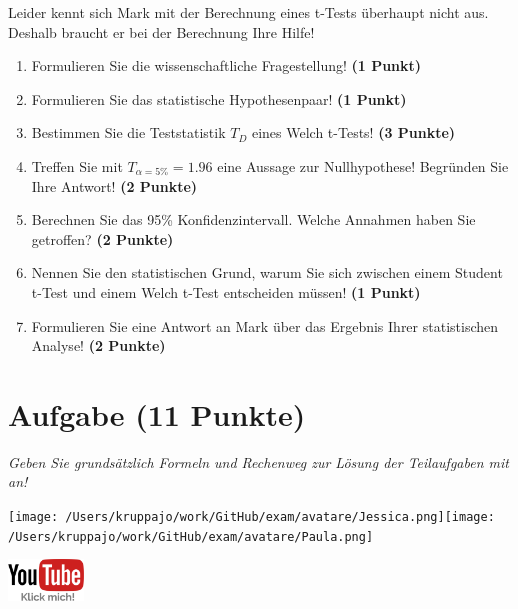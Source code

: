 \documentclass[a4paper, 9pt]{scrartcl}\usepackage[]{graphicx}\usepackage[]{xcolor}
\begin{document}
Leider kennt sich Mark mit der Berechnung eines t-Tests überhaupt nicht aus. Deshalb braucht er bei der Berechnung Ihre Hilfe!

\begin{enumerate}
  \item Formulieren Sie die wissenschaftliche Fragestellung! \textbf{(1 Punkt)}
  \item Formulieren Sie das statistische Hypothesenpaar! \textbf{(1 Punkt)}
  \item Bestimmen Sie die Teststatistik $T_{D}$ eines  Welch t-Tests! \textbf{(3 Punkte)}
  \item Treffen Sie mit $T_{\alpha = 5\%} = 1.96$ eine Aussage zur Nullhypothese! Begründen Sie Ihre Antwort! \textbf{(2 Punkte)}
\item Berechnen Sie das 95\% Konfidenzintervall. Welche Annahmen haben Sie getroffen? \textbf{(2 Punkte)}
\item Nennen Sie den statistischen Grund, warum Sie sich zwischen einem Student t-Test und einem Welch t-Test entscheiden müssen! \textbf{(1 Punkt)}
\item Formulieren Sie eine Antwort an Mark über das Ergebnis Ihrer statistischen Analyse! \textbf{(2 Punkte)}
\end{enumerate} 
\clearpage

\section{Aufgabe \hfill (11 Punkte)}

\textit{Geben Sie grundsätzlich Formeln und Rechenweg zur Lösung der Teilaufgaben mit an!} \\[1Ex]
 

 
\begin{minipage}[t]{0.5\textwidth}
\texttt{[image: /Users/kruppajo/work/GitHub/exam/avatare/Jessica.png]}\hspace{-4mm}\texttt{[image: /Users/kruppajo/work/GitHub/exam/avatare/Paula.png]}
\end{minipage}
\begin{minipage}[t]{0.5\textwidth}
\hfill
\href{https://youtu.be/QR90zyn0Iz8}{\includegraphics[width = 2cm]{img/youtube}}
\end{minipage}
\end{document}
